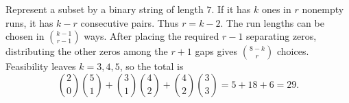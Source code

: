 Represent a subset by a binary string of length $7$. If it has $k$ ones in $r$ nonempty runs, it has $k-r$ consecutive pairs. Thus $r=k-2$. The run lengths can be chosen in $\binom{k-1}{r-1}$ ways. After placing the required $r-1$ separating zeros, distributing the other zeros among the $r+1$ gaps gives $\binom{8-k}{r}$ choices. Feasibility leaves $k=3,4,5$, so the total is
\[
\binom20\binom51+\binom31\binom42+\binom42\binom33
=5+18+6=\boxed{29}.
\]
